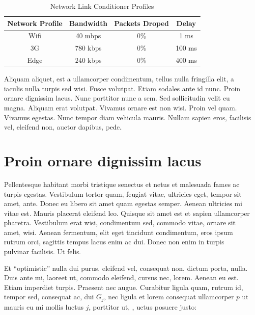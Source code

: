 \begin{table}[htb]
\centering
\normalsize
    \caption{Network Link Conditioner Profiles}
    \label{tab:network_profiles}
{\footnotesize
    \begin{tabular}{ | c | c | c | c | }
    \hline 
    \textbf{Network Profile}	& \textbf{Bandwidth} & \textbf{Packets Droped} & \textbf{Delay}\\ \hline \hline
    Wifi  & 40 mbps  &  0\%  &   1 ms \\ \hline
    3G  & 780 kbps  &  0\%  &   100 ms \\ \hline 
    Edge  & 240 kbps  &  0\%  &   400 ms \\ \hline
    \end{tabular}
    }
\end{table}

Aliquam aliquet, est a ullamcorper condimentum, tellus nulla fringilla elit, a iaculis nulla turpis sed wisi. Fusce volutpat. Etiam sodales ante id nunc. Proin ornare dignissim lacus. Nunc porttitor nunc a sem. Sed sollicitudin velit eu magna. Aliquam erat volutpat. Vivamus ornare est non wisi. Proin vel quam. Vivamus egestas. Nunc tempor diam vehicula mauris. Nullam sapien eros, facilisis vel, eleifend non, auctor dapibus, pede.
\section{Proin ornare dignissim lacus}
Pellentesque habitant morbi tristique senectus et netus et malesuada fames ac turpis egestas. Vestibulum tortor quam, feugiat vitae, ultricies eget, tempor sit amet, ante. Donec eu libero sit amet quam egestas semper. Aenean ultricies mi vitae est. Mauris placerat eleifend leo. Quisque sit amet est et sapien ullamcorper pharetra. Vestibulum erat wisi, condimentum sed, commodo vitae, ornare sit amet, wisi. Aenean fermentum, elit eget tincidunt condimentum, eros ipsum rutrum orci, sagittis tempus lacus enim ac dui. Donec non enim in turpis pulvinar facilisis. Ut felis.

Et ``optimistic'' nulla dui purus, eleifend vel, consequat non, dictum porta, nulla. Duis ante mi, laoreet ut, commodo eleifend, cursus nec, lorem. Aenean eu est. Etiam imperdiet turpis. Praesent nec augue. Curabitur ligula quam, rutrum id, tempor sed, consequat ac, dui $G_j$, nec ligula et lorem consequat ullamcorper $p$ ut mauris eu mi mollis luctus $j$, porttitor ut, , uctus posuere justo:


